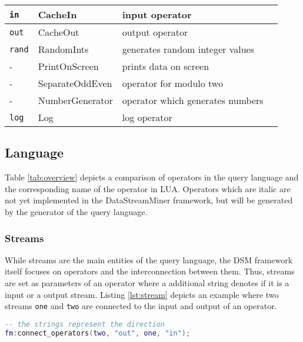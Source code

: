\begin{center}
\begin{tabular}{|l|l|l|l|}
  \hline 
  \texttt{in} & CacheIn & input operator \\
  \hline
  \texttt{out} & CacheOut & output operator \\
  \hline
  \texttt{rand} & RandomInts & generates random integer values \\
  \hline
  - & PrintOnScreen & prints data on screen \\
  \hline  
  - & SeparateOddEven & operator for modulo two \\
  \hline  
  - & NumberGenerator & operator which generates numbers \\
  \hline  
  \texttt{log} & Log & log operator \\
  \hline
  \end{tabular}
  \label{tab:overview}
\end{center}

\subsection{Language}
Table \ref{tab:overview} depicts a comparison of operators in the query language
and the corresponding name of the operator in LUA. Operators which are italic 
are not yet implemented in the DataStreamMiner framework, but will be generated
by the generator of the query language.

\subsubsection{Streams}
While streams are the main entities of the query language, the DSM framework 
itself focuses on operators and the interconnection between them. Thus, streams
are set as parameters of an operator where a additional string denotes if it is 
a input or a output stream. Listing \ref{lst:stream} depicts an example where 
two streams \texttt{one} and \texttt{two} are connected to the input and output 
of an operator.
\begin{lstlisting}[language=Lua, caption={\emph{Example of Streams in LUA}},label={lst:stream}]
-- the strings represent the direction
fm:connect_operators(two, "out", one, "in");
\end{lstlisting}

